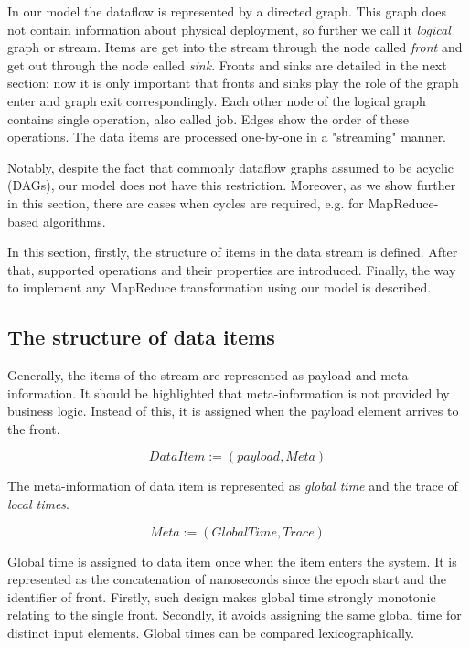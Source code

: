 
\label {fs-model-section}


In our model the dataflow is represented by a directed graph. This graph does not contain information about physical deployment, so further we call it {\it logical} graph or stream. Items are get into the stream through the node called {\it front} and get out through the node called {\it sink}. Fronts and sinks are detailed in the next section; now it is only important that fronts and sinks play the role of the graph enter and graph exit correspondingly. Each other node of the logical graph contains single operation, also called job. Edges show the order of these operations. The data items are processed one-by-one in a "streaming" manner. 

Notably, despite the fact that commonly dataflow graphs assumed to be acyclic (DAGs), our model does not have this restriction. Moreover, as we show further in this section, there are cases when cycles are required, e.g. for MapReduce-based algorithms. 

In this section, firstly, the structure of items in the data stream is defined. After that, supported operations and their properties are introduced. Finally, the way to implement any MapReduce transformation using our model is described.

\subsection{The structure of data items}
Generally, the items of the stream are represented as payload and meta-information. It should be highlighted that meta-information is not provided by business logic. Instead of this, it is assigned when the payload element arrives to the front. 

\[DataItem := (payload, Meta)\]

The meta-information of data item is represented as {\it global time} and the trace of {\it local times}.

\[Meta := (GlobalTime, Trace)\]

Global time is assigned to data item once when the item enters the system. It is represented as the concatenation of nanoseconds since the epoch start and the identifier of front. Firstly, such design makes global time strongly monotonic relating to the single front. Secondly, it avoids assigning the same global time for distinct input elements. Global times can be compared lexicographically.

